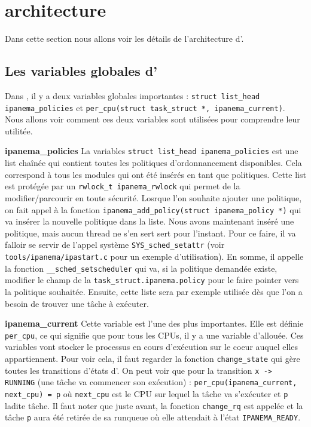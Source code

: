 \section{\ipa architecture}
\par Dans cette section nous allons voir les détails de l'architecture d'\ipa.

\subsection{Les variables globales d'\ipa}
Dans \ipa, il y a deux variables globales importantes : \texttt{struct list\_head ipanema\_policies} et \texttt{per\_cpu(struct task\_struct *, ipanema\_current)}. Nous allons voir comment ces deux variables sont utilisées pour comprendre leur utilitée.\newline

\par{\textbf{ipanema\_policies}} La variables \texttt{struct list\_head ipanema\_policies} est une list chaînée qui contient toutes les politiques d'ordonnancement disponibles. Cela correspond à tous les modules qui ont été insérés en tant que politiques. Cette list est protégée par un \texttt{rwlock\_t ipanema\_rwlock} qui permet de la modifier/parcourir en toute sécurité.\newline
Losrque l'on souhaite ajouter une politique, on fait appel à la fonction \texttt{ipanema\_add\_policy(struct ipanema\_policy *)} qui va insérer la nouvelle politique dans la liste.\newline
Nous avons maintenant inséré une politique, mais aucun thread ne s'en sert sert pour l'instant. Pour ce faire, il va falloir se servir de l'appel système \texttt{SYS\_sched\_setattr} (voir \texttt{tools/ipanema/ipastart.c} pour un exemple d'utilisation). En somme, il appelle la fonction \texttt{\_\_sched\_setscheduler} qui va, si la politique demandée existe, modifier le champ de la \texttt{task\_struct.ipanema.policy} pour le faire pointer vers la politique souhaitée. Ensuite, cette liste sera par exemple utilisée dès que l'on a besoin de trouver une tâche à exécuter.\newline

\par{\textbf{ipanema\_current}} Cette variable est l'une des plus importantes. Elle est définie \texttt{per\_cpu}, ce qui signifie que pour tous les CPUs, il y a une variable d'allouée. Ces variables vont stocker le processus en cours d'exécution sur le coeur auquel elles appartiennent. Pour voir cela, il faut regarder la fonction \texttt{change\_state} qui gère toutes les transitions d'états d'\ipa. On peut voir que pour la transition \texttt{x -> RUNNING} (une tâche va commencer son exécution) : \texttt{per\_cpu(ipanema\_current, next\_cpu) = p} où \texttt{next\_cpu} est le CPU sur lequel la tâche va s'exécuter et \texttt{p} ladite tâche.\newline
Il faut noter que juste avant, la fonction \texttt{change\_rq} est appelée et la tâche \texttt{p} aura été retirée de sa runqueue où elle attendait à l'état \texttt{IPANEMA\_READY}.
